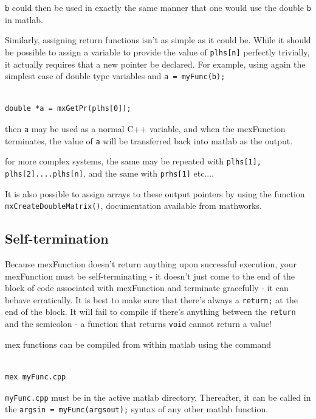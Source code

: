 \documentclass[12pt,a4paper]{article}
\begin{document}
\texttt{b} could then be used in exactly the same manner that one would use the double \texttt{b} in matlab.

Similarly, assigning return functions isn't as simple as it could be. While it should be possible to assign a variable to provide the value of \texttt{plhs[n]} perfectly trivially, it actually requires that a new pointer be declared. For example, using again the simplest case of double type variables and \texttt{a = myFunc(b);} 

\lstset{language=C++}
\begin{lstlisting}

double *a = mxGetPr(plhs[0]);

\end{lstlisting}

then \texttt{a} may be used as a normal C++ variable, and when the mexFunction terminates, the value of \texttt{a} will be transferred back into matlab as the output.

for more complex systems, the same may be repeated with \texttt{plhs[1], plhs[2]....plhs[n]}, and the same with \texttt{prhs[1]} etc....

It is also possible to assign arrays to these output pointers by using the function \texttt{mxCreateDoubleMatrix()}, documentation available from mathworks.

\subsection{Self-termination}

Because mexFunction doesn't return anything upon successful execution, your mexFunction must be self-terminating - it doesn't just come to the end of the block of code associated with mexFunction and terminate gracefully - it can behave erratically. It is best to make sure that there's always a \texttt{return;} at the end of the block. It will fail to compile if there's anything between the \texttt{return} and the semicolon - a function that returns \texttt{void} cannot return a value!

mex functions can be compiled from within matlab using the command 

\lstset{language=matlab}
\begin{lstlisting}

mex myFunc.cpp

\end{lstlisting}

\texttt{myFunc.cpp} must be in the active matlab directory. Thereafter, it can be called in the \texttt{argsin = myFunc(argsout);} syntax of any other matlab function.
\end{document}
